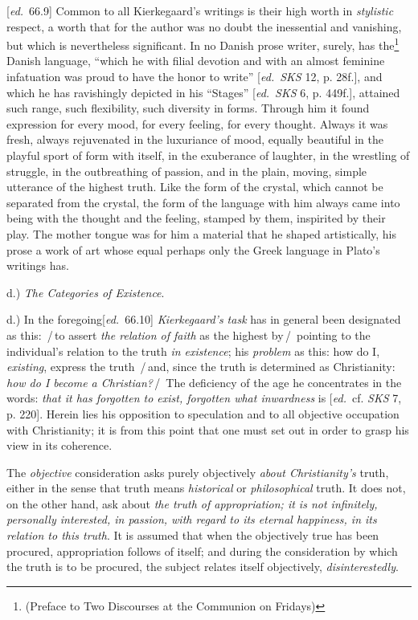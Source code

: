 \documentclass[12pt,a4paper,openany]{book}
\newcommand{\kpage}[1]{\marginnote{\footnotesize\textit{[#1]}}}
\newcommand{\ed}[1]{{\small[\textit{ed.}\ #1]}}
\newcommand{\ins}[1]{\,/\,#1\,/\,}
\newcommand{\lecture}[1]{\par\bigskip\noindent{\large #1}\par\nobreak\medskip}
\begin{document}
\ed{66.9} Common to all Kierkegaard's writings is their high worth in
\emph{stylistic} respect, a worth that for the author was no doubt the
inessential and vanishing, but which is nevertheless significant.
\kpage{108}In no Danish prose writer, surely, has the\footnote[36]{(Preface to
Two Discourses at the Communion on Fridays)} Danish language, ``which he with
filial devotion and with an almost feminine infatuation was proud to have the
honor to write'' \ed{\emph{SKS} 12, p. 28f.}, and which he has ravishingly
depicted in his ``Stages'' \ed{\emph{SKS} 6, p. 449f.}, attained such range,
such flexibility, such diversity in forms. Through him it found expression for
every mood, for every feeling, for every thought. Always it was fresh, always
rejuvenated in the luxuriance of mood, equally beautiful in the playful sport of
form with itself, in the exuberance of laughter, in the wrestling of struggle,
in the outbreathing of passion, and in the plain, moving, simple utterance of
the highest truth. Like the form of the crystal, which cannot be separated from
the crystal, the form of the language with him always came into being with the
thought and the feeling, stamped by them, inspirited by their play. The mother
tongue was for him a material that he shaped artistically, his prose a work of
art whose equal perhaps only the Greek language in Plato's writings has.

\lecture{Lecture 22}

d.) \emph{The Categories of Existence}.

d.) In the foregoing\ed{66.10} \emph{Kierkegaard's task} has in general been
designated as this: \ins{to assert \emph{the relation of faith} as the highest
by} pointing to the individual's relation to the truth \emph{in existence}; his
\emph{problem} as this: how do I, \emph{existing}, express the truth \ins{and,
since the truth is determined as Christianity: \emph{how do I become a
Christian?}} The deficiency of the age he concentrates in the words: \emph{that
it has forgotten to exist, forgotten what inwardness} is \ed{cf. \emph{SKS} 7,
p. 220}. Herein lies his opposition to speculation and to all objective
occupation with Christianity; it is from this point that one must set out in
order to grasp his view in its coherence.

The \emph{objective} consideration asks purely objectively \emph{about Christianity's}
truth, either in the sense that truth means \emph{historical}
or \emph{philosophical} truth. It does not, on the other hand, ask about
\emph{the truth of appropriation; it is not infinitely, personally interested,
in passion, with regard to its eternal happiness, in its relation to this
truth}. It is assumed that when \kpage{109}the objectively true has been
procured, appropriation follows of itself; and during the consideration by which
the truth is to be procured, the subject relates itself objectively,
\emph{disinterestedly}.
\end{document}
